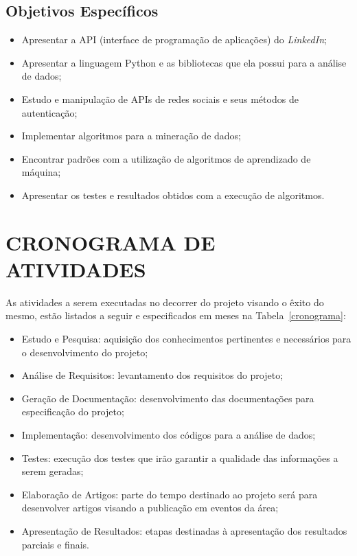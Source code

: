 \subsection{Objetivos Específicos}\label{subsec:objetivos_especificos}

\begin{itemize}
    \item Apresentar a API (interface de programação de aplicações) do \textit{LinkedIn};
    \item Apresentar a linguagem Python e as bibliotecas que ela possui para a análise de dados;
    \item Estudo e manipulação de APIs de redes sociais e seus métodos de autenticação;
    \item Implementar algoritmos para a mineração de dados;
    \item Encontrar padrões com a utilização de algoritmos de aprendizado de máquina;
    \item Apresentar os testes e resultados obtidos com a execução de algoritmos.
\end{itemize}

\section{CRONOGRAMA DE ATIVIDADES}\label{subsec:cronograma}

As atividades a serem executadas no decorrer do projeto visando o êxito do mesmo, estão listados a seguir e especificados em meses na Tabela~\ref{cronograma}:

\begin{itemize}
  \item Estudo e Pesquisa: aquisição dos conhecimentos pertinentes e necessários para o desenvolvimento do projeto;
  \item Análise de Requisitos: levantamento dos requisitos do projeto;
  \item Geração de Documentação: desenvolvimento das documentações para especificação do projeto;
  \item Implementação: desenvolvimento dos códigos para a análise de dados;
  \item Testes: execução dos testes que irão garantir a qualidade das informações a serem geradas;
  \item Elaboração de Artigos: parte do tempo destinado ao projeto será para desenvolver artigos visando a publicação em eventos da área;
  \item Apresentação de Resultados: etapas destinadas à apresentação dos resultados parciais e finais.
\end{itemize}


